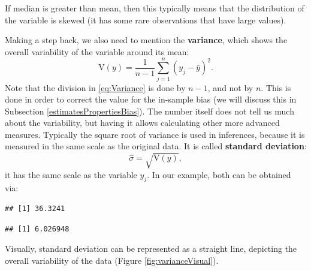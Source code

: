 \documentclass[
]{book}
\newenvironment{Shaded}{\begin{snugshade}}{\end{snugshade}}
\newcommand{\KeywordTok}[1]{\textcolor[rgb]{0.13,0.29,0.53}{\textbf{#1}}}
\newcommand{\NormalTok}[1]{#1}
\newcommand{\OperatorTok}[1]{\textcolor[rgb]{0.81,0.36,0.00}{\textbf{#1}}}
\theoremstyle{definition}
\theoremstyle{definition}
\theoremstyle{definition}
\theoremstyle{definition}
\theoremstyle{remark}
\begin{document}
If median is greater than mean, then this typically means that the distribution of the variable is skewed (it has some rare observations that have large values).

Making a step back, we also need to mention the \textbf{variance}, which shows the overall variability of the variable around its mean:
\begin{equation}
    \mathrm{V}(y)= \frac{1}{n-1}\sum_{j=1}^n (y_j - \bar{y})^2 .
    \label{eq:Variance}
\end{equation}
Note that the division in \eqref{eq:Variance} is done by \(n-1\), and not by \(n\). This is done in order to correct the value for the in-sample bias (we will discuss this in Subsection \ref{estimatesPropertiesBias}). The number itself does not tell us much about the variability, but having it allows calculating other more advanced measures. Typically the square root of variance is used in inferences, because it is measured in the same scale as the original data. It is called \textbf{standard deviation}:
\begin{equation}
    \hat{\sigma} = \sqrt{\mathrm{V}(y)} ,
    \label{eq:StdDev}
\end{equation}
it has the same scale as the variable \(y_j\). In our example, both can be obtained via:

\begin{Shaded}
\end{Shaded}

\begin{verbatim}
## [1] 36.3241
\end{verbatim}

\begin{Shaded}
\end{Shaded}

\begin{verbatim}
## [1] 6.026948
\end{verbatim}

Visually, standard deviation can be represented as a straight line, depicting the overall variability of the data (Figure \ref{fig:varianceVisual}).
\end{document}
